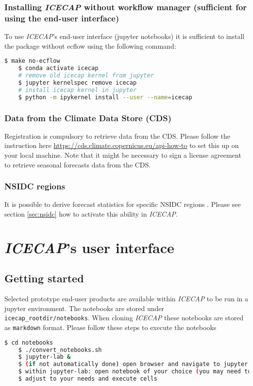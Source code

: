 \documentclass[DIV=10, parskip=full]{scrreprt}
\newcommand{\ice}{\textit{ICECAP}\xspace}
\begin{document}
\subsection{Installing \ice without workflow manager (sufficient for using the end-user interface)}
To use  \ice's end-user interface (jupyter notebooks) it is sufficient to install the package without ecflow using the following command:
\begin{lstlisting}[language=bash]
	$ make no-ecflow
	$ conda activate icecap
	# remove old icecap kernel from jupyter
	$ jupyter kernelspec remove icecap
	# install icecap kernel in jupyter
	$ python -m ipykernel install --user --name=icecap
\end{lstlisting}



	
\subsection{Data from the Climate Data Store (CDS)}
\label{subsec:cds}
Registration is compulsory to retrieve data from the CDS. Please follow the instruction here \url{https://cds.climate.copernicus.eu/api-how-to} to set this up on your local machine. Note that it might be necessary to sign a license agreement to retrieve seasonal forecasts data from the CDS.


	
\subsection{NSIDC regions}
\label{subsec:nsidc}
It is possible to derive forecast statistics for specific NSIDC regions \citep{Meier2023}. Please see section \ref{sec:nsidc} how to activate this ability in \ice.

\chapter{\ice's user interface}

\section{Getting started}
Selected prototype end-user products are available within \ice to be run in a jupyter environment. The notebooks are stored under \texttt{icecap\_rootdir/notebooks}. When cloning \ice these notebooks are stored as \texttt{markdown} format. Please follow these steps to execute the notebooks
\begin{lstlisting}[language=bash]
	$ cd notebooks
	$ ./convert_notebooks.sh
	$ jupyter-lab & 
	$ (if not automatically done) open browser and navigate to jupyter lab
	$ within jupyter-lab: open notebook of your choice (you may need to set kernel to icecap)
	$ adjust to your needs and execute cells
\end{lstlisting}
\end{document}
